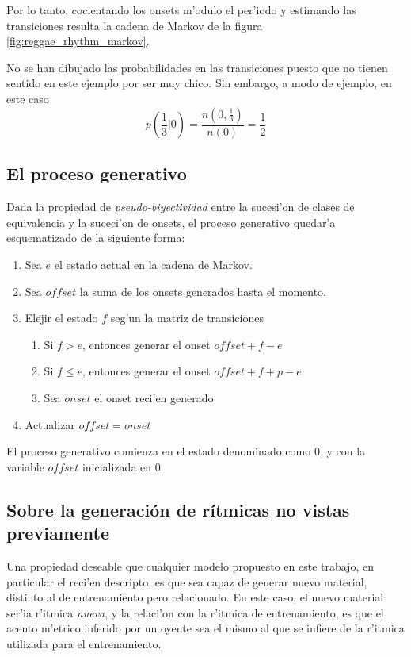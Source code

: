 Por lo tanto, cocientando los onsets m'odulo el per'iodo y estimando las transiciones resulta la cadena de Markov de la figura \ref{fig:reggae_rhythm_markov}.
\begin{imagen}
\end{imagen}

No se han dibujado las probabilidades en las transiciones puesto que no tienen sentido en este ejemplo por ser muy chico. Sin embargo, a modo de ejemplo, en este caso
$$p(\frac{1}{3}|0) = \frac{n(0, \frac{1}{3})}{n(0)} = \frac{1}{2}$$

\subsection{El proceso generativo}
Dada la propiedad de \emph{pseudo-biyectividad} entre la sucesi'on de clases de equivalencia y la suceci'on de onsets, el proceso generativo quedar'a esquematizado de la siguiente 
forma:

\begin{enumerate}
  \item Sea $e$ el estado actual en la cadena de Markov. 
  \item Sea $offset$ la suma de los onsets generados hasta el momento. 
  \item Elejir el estado $f$ seg'un la matriz de transiciones
  \begin{enumerate}
    \item Si $f > e$, entonces generar el onset $offset + f-e$
    \item Si $f \leq e$, entonces generar el onset $offset + f + p - e$
    \item Sea $onset$ el onset reci'en generado
  \end{enumerate}
  \item Actualizar $offset = onset$
\end{enumerate}

El proceso generativo comienza en el estado denominado como $0$, y con la variable $offset$ inicializada en $0$.

\subsection{Sobre la generaci\'on de r\'itmicas no vistas previamente}
Una propiedad deseable que cualquier modelo propuesto en este trabajo, en particular el reci'en descripto, es que sea capaz de generar nuevo material, distinto al de entrenamiento
pero relacionado. En este caso, el nuevo material ser'ia r'itmica \emph{nueva}, y la relaci'on con la r'itmica de entrenamiento, es que el acento m'etrico inferido por un oyente 
sea el mismo al que se infiere de la r'itmica utilizada para el entrenamiento. 


